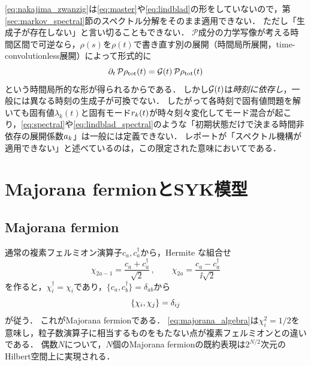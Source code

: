 \documentclass[a4paper,11pt,onecolumn]{jlreq}
\begin{document}
\eqref{eq:nakajima_zwanzig}は\eqref{eq:master}や\eqref{eq:lindblad}の形をしていないので，第\ref{sec:markov_spectral}節のスペクトル分解をそのまま適用できない．
ただし「生成子が存在しない」と言い切ることもできない．
$\mathcal{P}$成分の力学写像が考える時間区間で可逆なら，$\rho(s)$を$\rho(t)$で書き直す別の展開（時間局所展開，time-convolutionless展開）によって形式的に
\begin{equation}
  \partial_t\,\mathcal{P}\rho_{\mathrm{tot}}(t) = \mathcal{G}(t)\,\mathcal{P}\rho_{\mathrm{tot}}(t)
  \label{eq:tcl}
\end{equation}
という時間局所的な形が得られるからである．
しかし$\mathcal{G}(t)$は\emph{時刻に依存し}，一般には異なる時刻の生成子が可換でない．
したがって各時刻で固有値問題を解いても固有値$\lambda_k(t)$と固有モード$r_{k}(t)$が時々刻々変化してモード混合が起こり，\eqref{eq:spectral}や\eqref{eq:lindblad_spectral}のような「初期状態だけで決まる時間非依存の展開係数$a_{k}$」は一般には定義できない．
レポートが「スペクトル機構が適用できない」と述べているのは，この限定された意味においてである．

\section{Majorana fermionとSYK模型}
\label{sec:syk}

\subsection{Majorana fermion}
\label{sec:syk_majorana}

通常の複素フェルミオン演算子$c_a,c_a^{\dagger}$から，Hermite な組合せ
\begin{equation}
  \chi_{2a-1} = \frac{c_a + c_a^{\dagger}}{\sqrt{2}}\,,
  \qquad
  \chi_{2a} = \frac{c_a - c_a^{\dagger}}{\ii\sqrt{2}}
  \label{eq:majorana_def}
\end{equation}
を作ると，$\chi_i^{\dagger}=\chi_i$であり，$\{c_a,c_b^{\dagger}\}=\delta_{ab}$から
\begin{equation}
  \acomm{\chi_i}{\chi_j} = \delta_{ij}
  \label{eq:majorana_algebra}
\end{equation}
が従う．
これがMajorana fermionである．
\eqref{eq:majorana_algebra}は$\chi_i^2=1/2$を意味し，粒子数演算子に相当するものをもたない点が複素フェルミオンとの違いである．
偶数$N$について，$N$個のMajorana fermionの既約表現は$2^{N/2}$次元のHilbert空間上に実現される．
\end{document}
